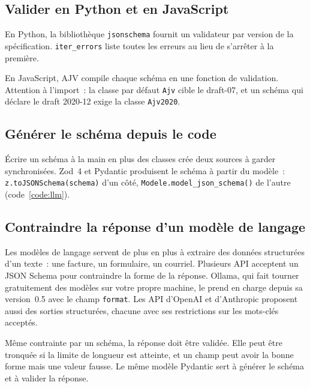 \documentclass[12pt,a4paper]{article}
\newcommand{\exemple}[3][]{%
  \par\addvspace{6pt}\noindent\begin{minipage}{\linewidth}%
  \end{minipage}\par\addvspace{6pt}}
\begin{document}
\subsection{Valider en Python et en JavaScript}
En Python, la bibliothèque \texttt{jsonschema} fournit un validateur par version de la spécification. \texttt{iter\_errors} liste toutes les erreurs au lieu de s'arrêter à la première.

\exemple[language=python]{python/06_jsonschema.py}{Validation avec \texttt{jsonschema}}

En JavaScript, AJV compile chaque schéma en une fonction de validation. Attention à l'import~: la classe par défaut \texttt{Ajv} cible le draft-07, et un schéma qui déclare le draft 2020-12 exige la classe \texttt{Ajv2020}.

\exemple[language=javascript]{js/10_ajv.mjs}{Validation avec AJV et \texttt{ajv-formats}}

\subsection{Générer le schéma depuis le code}
Écrire un schéma à la main en plus des classes crée deux sources à garder synchronisées. Zod~4 et Pydantic produisent le schéma à partir du modèle~: \texttt{z.toJSONSchema(schema)} d'un côté, \texttt{Modele.model\_json\_schema()} de l'autre (code~\ref{code:llm}).

\exemple[language=javascript]{js/09_zod_vers_schema.ts}{JSON Schema généré par Zod 4}

\subsection{Contraindre la réponse d'un modèle de langage}
Les modèles de langage servent de plus en plus à extraire des données structurées d'un texte~: une facture, un formulaire, un courriel. Plusieurs API acceptent un JSON Schema pour contraindre la forme de la réponse. Ollama, qui fait tourner gratuitement des modèles sur votre propre machine, le prend en charge depuis sa version~0.5 avec le champ \texttt{format}. Les API d'OpenAI et d'Anthropic proposent aussi des sorties structurées, chacune avec ses restrictions sur les mots-clés acceptés.

\exemple[language=python,label=code:llm]{python/09_schema_llm.py}{Schéma généré par Pydantic pour une extraction de données}

Même contrainte par un schéma, la réponse doit être validée. Elle peut être tronquée si la limite de longueur est atteinte, et un champ peut avoir la bonne forme mais une valeur fausse. Le même modèle Pydantic sert à générer le schéma et à valider la réponse.
\end{document}
